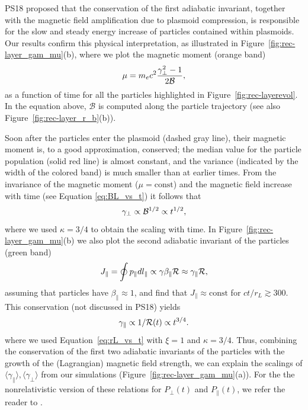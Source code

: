 PS18 proposed that the conservation of the first adiabatic invariant, together with the magnetic field amplification due to plasmoid compression, is responsible for the slow and steady energy increase of particles contained within plasmoids. Our results confirm this physical interpretation, as illustrated in  Figure~\ref{fig:rec-layer_gam_mu}(b),
where we plot the magnetic moment (orange band)
\begin{equation}
\label{eq:mu}
    \mu=m_e c^2\frac{\gamma_\perp^2-1}{2 \mathcal{B}},
\end{equation} 
as a function of time for all the particles highlighted in Figure~\ref{fig:rec-layerevol}. In the equation above, $\mathcal{B}$ is computed along the particle trajectory (see also Figure~\ref{fig:rec-layer_r_b}(b)).

Soon after the particles enter the plasmoid (dashed gray line), their magnetic moment is, to a good approximation, conserved; the median value for the particle population (solid red line) is almost constant, and the variance (indicated by the width of the colored band) is much smaller than at earlier times. From the invariance of the magnetic moment ($\mu = \mathrm{const}$) and the magnetic field increase with time (see Equation \eqref{eq:BL_vs_t}) it follows that
\begin{equation}
    \gamma_{\perp}\propto \mathcal{B}^{1/2}\propto t^{1/2},
\end{equation}
where we used $\kappa=3/4$ to obtain the scaling with time. In Figure~\ref{fig:rec-layer_gam_mu}(b) we also plot the second adiabatic invariant of the particles (green band)
\begin{equation}
\label{eq:Jpar}
    J_{\parallel}=\oint p_{\parallel}dl_{\parallel} \propto \gamma\beta_{\parallel}\mathcal{R}\approx
    \gamma_{\parallel}\mathcal{R},
\end{equation}
assuming that particles have $\beta_\parallel\approx 1$, and find that $J_{\parallel}\approx \mathrm{const}$ for $ct/r_L \gtrsim 300$. This conservation (not discussed in PS18) yields
\begin{equation}
    \gamma_{\parallel}\propto 1/\mathcal{R}(t)\propto t^{3/4}.
\end{equation}
where we used Equation~\eqref{eq:rL_vs_t} with $\xi=1$ and $\kappa=3/4$. Thus, combining the conservation of the first two adiabatic invariants of the particles with the growth of the (Lagrangian) magnetic field strength, we can explain the scalings of $\langle \gamma_{\parallel}\rangle, \langle\gamma_{\perp}\rangle$ from our simulations (Figure~\ref{fig:rec-layer_gam_mu}(a)). For the the nonrelativistic version of these relations for $P_\perp(t)$ and $P_\parallel(t)$, we refer the reader to  \cite{2017PhPl...24f2906M}.

